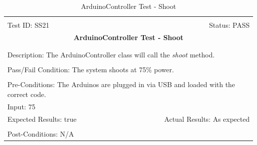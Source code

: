 \documentclass[11pt]{article}
\begin{document}
\begin{center}
\begin{table}[H]
\begin{tabular}{|l r|}\hline&\\[-2mm]
	Test ID: SS21	&Status: PASS\\[-3mm]
	\multicolumn{2}{|c|}{\textbf{\large{ArduinoController Test - Shoot}}}\\&\\\hline&\\[-3mm]
	\multicolumn{2}{|p{\textwidth}|}{Description: The ArduinoController class will call the \textit{shoot} method.}\\[1mm]\hline&\\[-3mm]
	\multicolumn{2}{|p{\textwidth}|}{Pass/Fail Condition: The system shoots at 75\% power.}\\[1mm]\hline&\\[-3mm]
	\multicolumn{2}{|p{\textwidth}|}{Pre-Conditions: The Arduinos are plugged in via USB and loaded with the correct code.}\\[4mm]
	\multicolumn{2}{|p{\textwidth}|}{Input: 75}\\[2mm]\hline
	\multicolumn{1}{|p{0.49\textwidth}}{Expected Results: true}	&\multicolumn{1}{|p{0.45\textwidth}|}{Actual Results: As expected}\\\hline&\\[-3mm]
	\multicolumn{2}{|p{\textwidth}|}{Post-Conditions: N/A}\\\hline
\end{tabular}
\caption{ArduinoController Test - Shoot}
\end{table}
\end{center}
\end{document}
